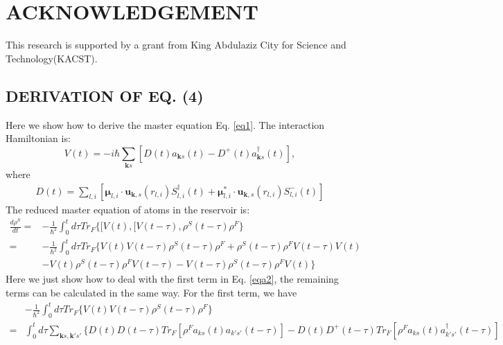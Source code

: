 \documentclass[aps,showpacs,twocolumn,twoside,groupedaddress]{revtex4}
\let\vec\bm
\begin{document}
\section{ACKNOWLEDGEMENT}
This research is supported by a grant from King Abdulaziz City for Science and Technology(KACST).

\begin{widetext}
\appendix
\section{DERIVATION OF EQ. (4) }
Here we show how to derive the master equation Eq. \eqref{eq1}. The interaction Hamiltonian is:
\begin{equation}
\label{eqa0}\tag{A1}
V(t)=-i\hbar \sum_{\vec{k}s}[D(t)a_{\vec{k}s}(t)-D^{+}(t)a^{\dagger}_{\vec{k}s}(t)],
\end{equation}
where
\begin{equation}
\label{eqa1}\tag{A2}
\begin{gathered}
D(t)=\underset{l,i}{\sum}[\vec{\mu}_{l,i}\cdot\vec{u}_{\vec{k},s}(r_{l,i})S_{l,i}^{\dagger}(t)+\vec{\mu}_{l,i}^{*}\cdot\vec{u}_{\vec{k},s}(r_{l,i})S_{l,i}^{-}(t)]
 \end{gathered}
\end{equation}
The reduced master equation of atoms in the reservoir is:
\begin{equation}
\label{eqa2}\tag{A3}
\begin{split}
\frac{d\rho^{S}}{dt}=&-\frac{1}{\hbar^{2}}\int_{0}^{t}d\tau Tr_{F}\{[V(t),[V(t-\tau),\rho^{S}(t-\tau)\rho^{F}\}\\
=&-\frac{1}{\hbar^{2}}\int_{0}^{t}d\tau Tr_{F}\{V(t)V(t-\tau)\rho^{S}(t-\tau)\rho^{F}+\rho^{S}(t-\tau)\rho^{F}V(t-\tau)V(t)\\
&-V(t)\rho^{S}(t-\tau)\rho^{F}V(t-\tau)-V(t-\tau)\rho^{S}(t-\tau)\rho^{F}V(t)\}
\end{split}
\end{equation} 
Here we just show how to deal with the first term in Eq. \eqref{eqa2}, the remaining terms can be calculated in the same way. For the first term, we have
\begin{equation}
\label{eqa3}\tag{A4}
\begin{split}
&-\frac{1}{\hbar^{2}}\int_{0}^{t}d\tau Tr_{F}\{V(t)V(t-\tau)\rho^{S}(t-\tau)\rho^{F}\}\\
=&\int_{0}^{t}d\tau\underset{\vec{k}s,\vec{k}'s'}{\sum}\{D(t)D(t-\tau)Tr_{F}[\rho^{F}a_{ks}(t)a_{k's'}(t-\tau)]-D(t)D^{+}(t-\tau)Tr_{F}[\rho^{F}a_{ks}(t)a^{\dagger}_{k's'}(t-\tau)]\\

\end{split}
\end{equation}
\end{widetext}
\end{document}
